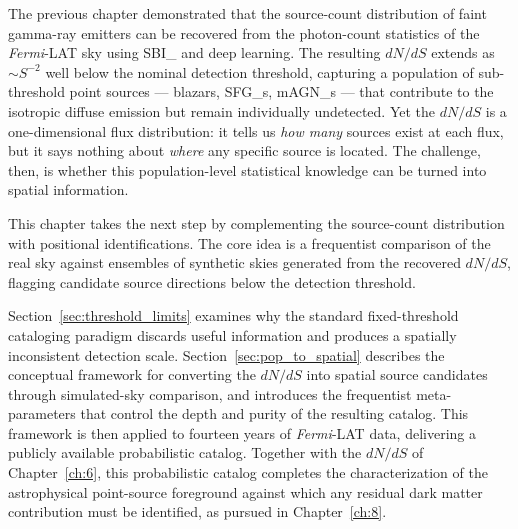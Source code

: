 The previous chapter demonstrated that the source-count distribution of faint gamma-ray emitters can be recovered from the photon-count statistics of the \textit{Fermi}-LAT sky using \gls{SBI_} and deep learning.
The resulting $dN/dS$ extends as $\sim S^{-2}$ well below the nominal detection threshold, capturing a population of sub-threshold point sources --- blazars, \glspl{SFG_}, \glspl{mAGN_} --- that contribute to the isotropic diffuse emission but remain individually undetected.
Yet the $dN/dS$ is a one-dimensional flux distribution: it tells us \emph{how many} sources exist at each flux, but it says nothing about \emph{where} any specific source is located.
The challenge, then, is whether this population-level statistical knowledge can be turned into spatial information.

This chapter takes the next step by complementing the source-count distribution with positional identifications.
The core idea is a frequentist comparison of the real sky against ensembles of synthetic skies generated from the recovered $dN/dS$, flagging candidate source directions below the detection threshold.

Section~\ref{sec:threshold_limits} examines why the standard fixed-threshold cataloging paradigm discards useful information and produces a spatially inconsistent detection scale.
Section~\ref{sec:pop_to_spatial} describes the conceptual framework for converting the $dN/dS$ into spatial source candidates through simulated-sky comparison, and introduces the frequentist meta-parameters that control the depth and purity of the resulting catalog.
This framework is then applied to fourteen years of \textit{Fermi}-LAT data, delivering a publicly available probabilistic catalog.
Together with the $dN/dS$ of Chapter~\ref{ch:6}, this probabilistic catalog completes the characterization of the astrophysical point-source foreground against which any residual dark matter contribution must be identified, as pursued in Chapter~\ref{ch:8}.
